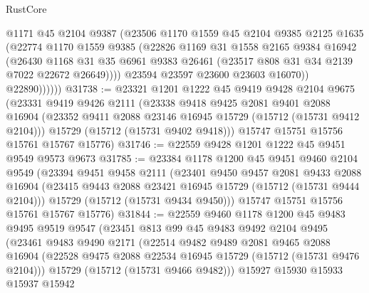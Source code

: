 \begin{lexlean}{RustCore}
\begin{coremodule}
                  @1171
                  @45
                  @2104
                  @9387
                  (@23506
                    @1170
                    @1559
                    @45
                    @2104
                    @9385
                    @2125
                    @1635
                    (@22774
                      @1170
                      @1559
                      @9385
                      (@22826
                        @1169
                        @31
                        @1558
                        @2165
                        @9384
                        @16942
                        (@26430
                          @1168
                          @31
                          @35
                          @6961
                          @9383
                          @26461
                          (@23517 @808 @31 @34 @2139 @7022 @22672 @26649))))
                    @23594
                    @23597
                    @23600
                    @23603
                    @16070))
                @22890))))))
@31738 := @23321
    @1201
    @1222
    @45
    @9419
    @9428
    @2104
    @9675
    (@23331
      @9419
      @9426
      @2111
      (@23338
        @9418
        @9425
        @2081
        @9401
        @2088
        @16904
        (@23352 @9411 @2088 @23146 @16945 @15729 (@15712 (@15731 @9412 @2104)))
        @15729
        (@15712 (@15731 @9402 @9418)))
      @15747
      @15751
      @15756
      @15761
      @15767
      @15776)
@31746 := @22559 @9428 @1201 @1222 @45 @9451 @9549 @9573 @9673
@31785 := @23384
    @1178
    @1200
    @45
    @9451
    @9460
    @2104
    @9549
    (@23394
      @9451
      @9458
      @2111
      (@23401
        @9450
        @9457
        @2081
        @9433
        @2088
        @16904
        (@23415 @9443 @2088 @23421 @16945 @15729 (@15712 (@15731 @9444 @2104)))
        @15729
        (@15712 (@15731 @9434 @9450)))
      @15747
      @15751
      @15756
      @15761
      @15767
      @15776)
@31844 := @22559
    @9460
    @1178
    @1200
    @45
    @9483
    @9495
    @9519
    @9547
    (@23451
      @813
      @99
      @45
      @9483
      @9492
      @2104
      @9495
      (@23461
        @9483
        @9490
        @2171
        (@22514
          @9482
          @9489
          @2081
          @9465
          @2088
          @16904
          (@22528 @9475 @2088 @22534 @16945 @15729 (@15712 (@15731 @9476 @2104)))
          @15729
          (@15712 (@15731 @9466 @9482)))
        @15927
        @15930
        @15933
        @15937
        @15942

\end{coremodule}
\end{lexlean}
